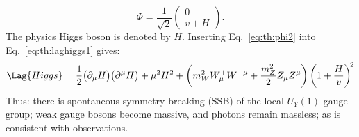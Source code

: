 \begin{equation}
  \Phi = \frac{1}{\sqrt{2}}
  \begin{pmatrix} 0 \\ v+H
  \end{pmatrix}.
  \label{eq:th:phi2}
\end{equation}
The physics Higgs boson is denoted by $H$.
Inserting Eq.~\ref{eq:th:phi2} into Eq.~\ref{eq:th:laghiggs1} gives:
\begin{equation}
  \Lag{Higgs} =
  \frac{1}{2}\big(\partial_\mu H\big)\big(\partial^\mu H\big)
  +\mu^2H^2
  +\left(m_W^2W_\mu^+W^{-\mu} + \frac{m_Z^2}{2}Z_\mu Z^\mu\right)
  \left(1 + \frac{H}{v}\right)^{\!2}
  \label{eq:th:laghiggs2}
\end{equation}
Thus: there is spontaneous symmetry breaking (SSB) of the local $U_Y(1)$ gauge group; weak gauge
bosons become massive, and photons remain massless; as is consistent with observations.

